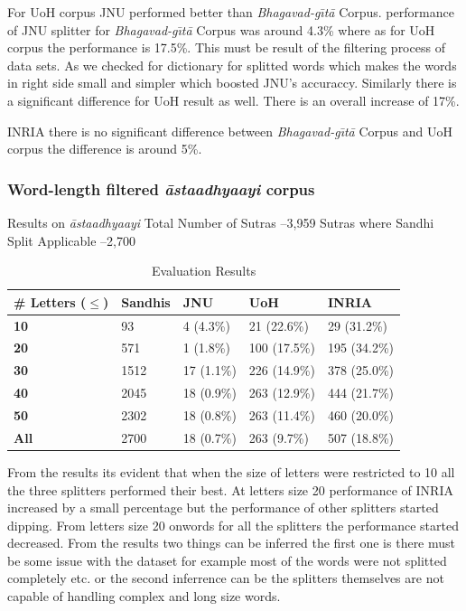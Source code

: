 \documentclass[11pt]{article}
\begin{document}
For UoH corpus JNU performed better than \textit{Bhagavad-g\={\i}t\={a}} Corpus. performance of JNU splitter for \textit{Bhagavad-g\={\i}t\={a}} Corpus was around 4.3\% where as for UoH corpus the performance is 17.5\%. This must be result of the filtering process of data sets. As we checked for dictionary for splitted words which makes the words in right side small and simpler which boosted JNU's accuraccy. Similarly there is a significant difference for UoH result as well. There is an overall increase of 17\%.

INRIA there is no significant difference between \textit{Bhagavad-g\={\i}t\={a}} Corpus and UoH corpus the difference is around 5\%.

\subsubsection{Word-length filtered \textit{\={a}staadhyaayi} corpus}
    
Results on \textit{\={a}staadhyaayi}
Total Number of Sutras –3,959
Sutras where Sandhi Split Applicable –2,700
    


\begin{table}[t]
\begin{center}
\begin{tabular}{ |p{1.5cm}|  p{1.1cm}| p{0.8cm}| p{1.1cm}| p{1.1cm}| }
\hline  
\bf \# Letters ($\le$) & \bf Sandhis & \bf JNU & \bf UoH & \bf INRIA\\
\hline
\bf	10	&	93	&	4 (4.3\%)	&	21 (22.6\%)	&	29 (31.2\%)	\\	\hline
\bf	20	&	571	&	1 (1.8\%)	&	100 (17.5\%)	&	195 (34.2\%)	\\	\hline
\bf	30	&	1512	&	17 (1.1\%)	&	226 (14.9\%)	&	378 (25.0\%)	\\	\hline
\bf	40	&	2045	&	18 (0.9\%)	&	263 (12.9\%)	&	444 (21.7\%)	\\	\hline
\bf	50	&	2302	&	18 (0.8\%)	&	263 (11.4\%)	&	460 (20.0\%)	\\	\hline
\bf	All	&	2700	&	18 (0.7\%)	&	263 (9.7\%)	&	507 (18.8\%)	\\	\hline
\end{tabular}
\end{center}
\caption{\label{font-table} Evaluation Results }
\end{table}

From the results its evident that when the size of letters were restricted to 10 all the three splitters performed their best. At letters size 20 performance of INRIA increased by a small percentage but the performance of other splitters started dipping. From letters size 20 onwords for all the splitters the performance started decreased. From the results two things can be inferred the first one is there must be some issue with the dataset for example most of the words were not splitted completely etc. or the second inferrence can be the splitters themselves are not capable of handling complex and long size words.
\end{document}
